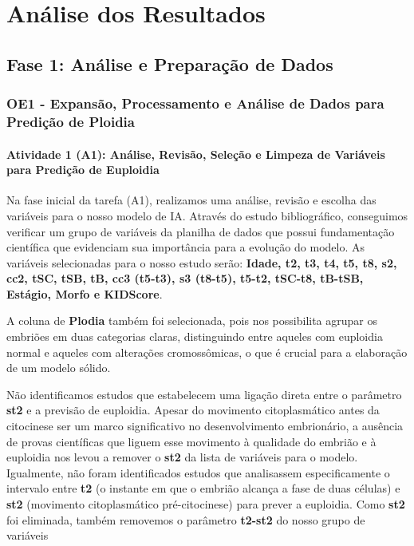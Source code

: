 \chapter[Análise dos Resultados]{Análise dos Resultados}

\section{Fase 1: Análise e Preparação de Dados}
\subsection{OE1 - Expansão, Processamento e Análise de Dados para Predição de Ploidia}
\subsubsection{Atividade 1 (A1): Análise, Revisão, Seleção e Limpeza de Variáveis para Predição de Euploidia}
Na fase inicial da tarefa (A1), realizamos uma análise, revisão e escolha das variáveis para o nosso modelo de IA. Através do estudo bibliográfico, conseguimos verificar um grupo de variáveis da planilha de dados que possui fundamentação científica que evidenciam sua importância para a evolução do modelo. As variáveis selecionadas para o nosso estudo serão: \textbf{Idade, t2, t3, t4, t5, t8, s2, cc2, tSC, tSB, tB, cc3 (t5-t3), s3 (t8-t5), t5-t2, tSC-t8, tB-tSB, Estágio, Morfo e KIDScore}. 

A coluna de \textbf{Plodia} também foi selecionada, pois nos possibilita agrupar os embriões em duas categorias claras, distinguindo entre aqueles com euploidia normal e aqueles com alterações cromossômicas, o que é crucial para a elaboração de um modelo sólido.

Não identificamos estudos que estabelecem uma ligação direta entre o parâmetro \textbf{st2} e a previsão de euploidia. Apesar do movimento citoplasmático antes da citocinese ser um marco significativo no desenvolvimento embrionário, a ausência de provas científicas que liguem esse movimento à qualidade do embrião e à euploidia nos levou a remover o \textbf{st2} da lista de variáveis para o modelo. Igualmente, não foram identificados estudos que analisassem especificamente o intervalo entre \textbf{t2} (o instante em que o embrião alcança a fase de duas células) e \textbf{st2} (movimento citoplasmático pré-citocinese) para prever a euploidia. Como \textbf{st2} foi eliminada, também removemos o parâmetro \textbf{t2-st2} do nosso grupo de variáveis

